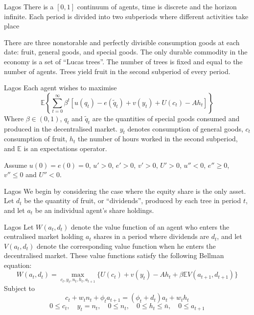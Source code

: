 \documentclass[aspectratio=169,xcolor=dvipsnames]{beamer}
\begin{document}
\begin{frame}{Lagos}
    There is a $[0,1]$ continuum of agents, time is discrete and the horizon infinite. Each period is divided into two subperiods where different activities take place

    \vspace{3mm}
    \begin{center}
    \end{center}
    \vspace{3mm}
    There are three nonstorable and perfectly divisible consumption goods at each date: fruit, general goods, and special goods. The only durable commodity in the economy is a set of ``Lucas trees''. The number of trees is fixed and equal to the number of agents. Trees yield fruit in the second subperiod of every period.
\end{frame}

\begin{frame}{Lagos}
    Each agent wishes to maximise
    \[
        \mathbb{E} \left\{ \sum_{t=0}^\infty \beta^t [u(q_t) - e(\tilde q_t) + v(y_t) + U(c_t) - A h_t]\right\}
    \]
    Where $\beta \in (0,1)$, $q_t$ and $\tilde q_t$ are the quantities of special goods consumed and produced in the decentralised market. $y_t$ denotes consumption of general goods, $c_t$ consumption of fruit, $h_t$ the number of hours worked in the second subperiod, and $\mathbb{E}$ is an expectations operator.

    Assume $u(0) = e(0) = 0$, $u' > 0$, $e' > 0$, $v' > 0$, $U' > 0$, $u'' < 0$, $e'' \ge 0$, $v'' \le 0$ and $U'' < 0$.
\end{frame}

\begin{frame}{Lagos}
    We begin by considering the case where the equity share is the only asset. Let $d_t$ be the quantity of fruit, or ``dividends'', produced by each tree in period $t$, and let $a_t$ be an individual agent's share holdings.
\end{frame}

\begin{frame}{Lagos}
    Let $W(a_t, d_t)$ denote the value function of an agent who enters the centralised market holding $a_t$ shares in a period where dividends are $d_t$, and let $V(a_t, d_t)$ denote the corresponding value function when he enters the decentralised market. These value functions satisfy the following Bellman equation:
    \[
        W(a_t, d_t) = \max_{c_t, y_t, n_t, h_t, a_{t+1}} \{U(c_t) + v(y_t) - A h_t + \beta \mathbb{E} V(a_{t+1}, d_{t+1})\}
    \]
    Subject to
    \[
        c_t + w_t n_t + \phi_t a_{t+1} = (\phi_t + d_t) a_t + w_t h_t
    \]
    \[
        0 \le c_t, \quad y_t = n_t, \quad 0 \le n_t, \quad 0 \le h_t \le \bar n, \quad 0 \le a_{t+1}
    \]
\end{frame}
\end{document}
